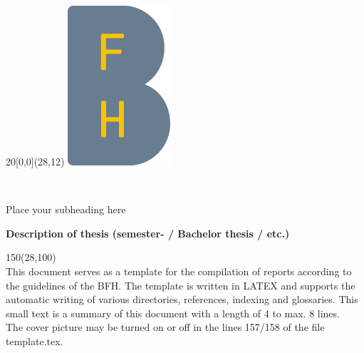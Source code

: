 %
%

\begin{titlepage}


\setlength{\unitlength}{1mm}
\begin{textblock}{20}[0,0](28,12)
	\includegraphics[scale=1.0]{images/BFH_Logo_B.png}
\end{textblock}

\begin{flushleft}

\vspace*{21mm}

\fontsize{26pt}{40pt}\selectfont 
\heading				\\							%
\vspace{2mm}

\fontsize{16pt}{24pt}\selectfont\vspace{0.3em}
Place your subheading here 			\\				%
\vspace{5mm}

\fontsize{10pt}{12pt}\selectfont
\textbf{Description of thesis (semester- / Bachelor thesis / etc.)} \\		%
\vspace{7mm}

\begin{textblock}{150}(28,100)
\fontsize{10pt}{12pt} \\ 
This document serves as a template for the compilation of reports according to the guidelines of the BFH. The template is written in LATEX and supports the automatic writing of various directories, references, indexing and glossaries. This small text is a summary of this document with a length of 4 to max. 8 lines. \\ 
The cover picture may be turned on or off in the lines 157/158 of the file template.tex.
\end{textblock}


\end{flushleft}
\end{titlepage}
